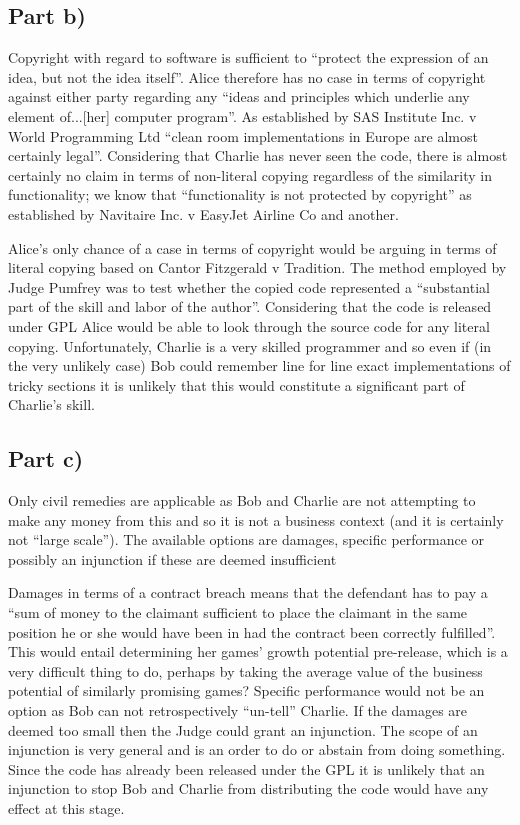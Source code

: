 \documentclass[a4paper, 6pt]{article}
\begin{document}
\subsection{Part b)}
 Copyright with regard to software is sufficient to ``protect the expression of an idea, but not the idea itself''.
 Alice therefore has no case in terms of copyright against either party regarding any ``ideas and principles which underlie any element of...[her] computer program''.
 As established by SAS Institute Inc. v World Programming Ltd ``clean room implementations in Europe are almost certainly legal''.
 Considering that Charlie has never seen the code, there is almost certainly no claim in terms of non-literal copying regardless of the similarity in functionality;
 we know that ``functionality is not protected by copyright'' as established by Navitaire Inc. v EasyJet Airline Co and another.

 Alice's only chance of a case in terms of copyright would be arguing in terms of literal copying based on Cantor Fitzgerald v Tradition.
 The method employed by Judge Pumfrey was to test whether the copied code represented a ``substantial part of the skill and labor of the author''.
 Considering that the code is released under GPL Alice would be able to look through the source code for any literal copying. Unfortunately, Charlie is a very skilled
 programmer and so even if (in the very unlikely case) Bob could remember line for line exact implementations of tricky sections it is unlikely that this would constitute
 a significant part of Charlie's skill.

\subsection{Part c)}
 Only civil remedies are applicable as Bob and Charlie are not attempting to make any money from this and so it is not a business context (and it is certainly not ``large scale'').
 The available options are damages, specific performance or possibly an injunction if these are deemed insufficient

 Damages in terms of a contract breach means that the defendant has to pay a ``sum of money to the claimant sufficient to place the claimant in the same position he or she would have been in had the contract been correctly fulfilled''.
 This would entail determining her games' growth potential pre-release, which is a very difficult thing to do, perhaps by taking the average value of the business potential of similarly promising games?
 Specific performance would not be an option as Bob can not retrospectively ``un-tell'' Charlie.
 If the damages are deemed too small then the Judge could grant an injunction. The scope of an injunction is very general and is an order to do or abstain from doing something. Since the code has already been released under the GPL it is unlikely that an injunction to stop Bob and Charlie from distributing the code would have any effect at this stage.
\end{document}
